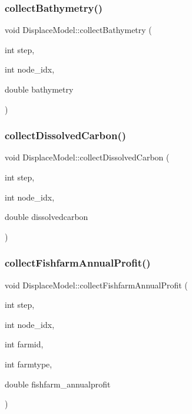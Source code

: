 \subsubsection{\texorpdfstring{collectBathymetry()}{collectBathymetry()}}
{\footnotesize\ttfamily void Displace\+Model\+::collect\+Bathymetry (\begin{DoxyParamCaption}\item[{int}]{step,  }\item[{int}]{node\+\_\+idx,  }\item[{double}]{bathymetry }\end{DoxyParamCaption})}

\mbox{\label{class_displace_model_a33bf82a29c201e87e6991519217e395f}} 
\subsubsection{\texorpdfstring{collectDissolvedCarbon()}{collectDissolvedCarbon()}}
{\footnotesize\ttfamily void Displace\+Model\+::collect\+Dissolved\+Carbon (\begin{DoxyParamCaption}\item[{int}]{step,  }\item[{int}]{node\+\_\+idx,  }\item[{double}]{dissolvedcarbon }\end{DoxyParamCaption})}

\mbox{\label{class_displace_model_a88449a36ca6d124e5116e59ec3ea0786}} 
\subsubsection{\texorpdfstring{collectFishfarmAnnualProfit()}{collectFishfarmAnnualProfit()}}
{\footnotesize\ttfamily void Displace\+Model\+::collect\+Fishfarm\+Annual\+Profit (\begin{DoxyParamCaption}\item[{int}]{step,  }\item[{int}]{node\+\_\+idx,  }\item[{int}]{farmid,  }\item[{int}]{farmtype,  }\item[{double}]{fishfarm\+\_\+annualprofit }\end{DoxyParamCaption})}

